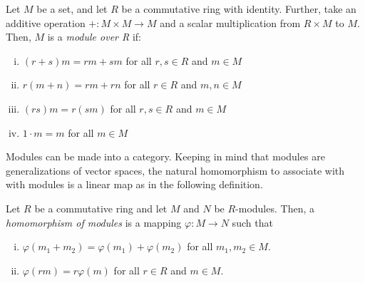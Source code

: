 \documentclass[../sean_thesis.tex]{subfiles}
\begin{document}
\begin{definition}[Module]
	Let $M$ be a set, and let $R$ be a commutative ring with identity. Further, take an additive operation $+: M \times M \to M$ and a scalar multiplication from $R \times M$ to $M$. Then, $M$ is a \emph{module over R} if:
\vspace{-\varparskip}
	\begin{enumerate}[(i)] 
		\item $(r+s)m = rm+sm$ for all $r,s \in R$ and $m \in M$
		\item $r(m+n) = rm + rn$ for all $r \in R$ and $m,n \in M$
		\item $(rs)m = r(sm)$ for all $r,s \in R$ and $m \in M$
		\item $1\cdot m = m$ for all $m \in M$
	\end{enumerate}
\end{definition}


Modules can be made into a category. Keeping in mind that modules are generalizations of vector spaces, the natural homomorphism to associate with with modules is a linear map as in the following definition.

\begin{definition}
	Let $R$ be a commutative ring and let $M$ and $N$ be $R$-modules. Then, a \emph{homomorphism of modules} is a mapping $\varphi: M \to N$ such that
\vspace{-\varparskip}
	\begin{enumerate}[(i)]
		\item $\varphi(m_1+m_2) = \varphi(m_1) + \varphi(m_2)$ for all $m_1,m_2 \in M$.
		\item $\varphi(rm) = r\varphi(m)$ for all $r \in R$ and $m \in M$.
	\end{enumerate}
\end{definition}


\end{document}
